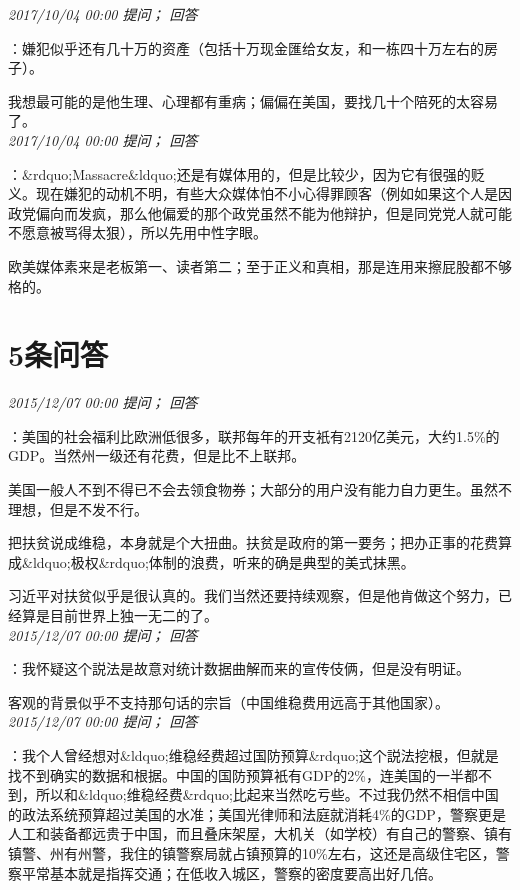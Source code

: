 \documentclass[twocolumn]{ctexart}
\begin{document}
\textit{\hfill\noindent\small 2017/10/04 00:00 提问； 回答}

：嫌犯似乎还有几十万的资產（包括十万现金匯给女友，和一栋四十万左右的房子）。

我想最可能的是他生理、心理都有重病；偏偏在美国，要找几十个陪死的太容易了。\\

\textit{\hfill\noindent\small 2017/10/04 00:00 提问； 回答}

：\&rdquo;Massacre\&ldquo;还是有媒体用的，但是比较少，因为它有很强的贬义。现在嫌犯的动机不明，有些大众媒体怕不小心得罪顾客（例如如果这个人是因政党偏向而发疯，那么他偏爱的那个政党虽然不能为他辩护，但是同党党人就可能不愿意被骂得太狠），所以先用中性字眼。

欧美媒体素来是老板第一、读者第二；至于正义和真相，那是连用来擦屁股都不够格的。\\

\section{5条问答}

\textit{\hfill\noindent\small 2015/12/07 00:00 提问； 回答}

：美国的社会福利比欧洲低很多，联邦每年的开支衹有2120亿美元，大约1.5\%的GDP。当然州一级还有花费，但是比不上联邦。

美国一般人不到不得已不会去领食物券；大部分的用户没有能力自力更生。虽然不理想，但是不发不行。

把扶贫说成维稳，本身就是个大扭曲。扶贫是政府的第一要务；把办正事的花费算成\&ldquo;极权\&rdquo;体制的浪费，听来的确是典型的美式抹黑。

习近平对扶贫似乎是很认真的。我们当然还要持续观察，但是他肯做这个努力，已经算是目前世界上独一无二的了。\\

\textit{\hfill\noindent\small 2015/12/07 00:00 提问； 回答}

：我怀疑这个説法是故意对统计数据曲解而来的宣传伎俩，但是没有明证。

客观的背景似乎不支持那句话的宗旨（中国维稳费用远高于其他国家）。\\

\textit{\hfill\noindent\small 2015/12/07 00:00 提问； 回答}

：我个人曾经想对\&ldquo;维稳经费超过国防预算\&rdquo;这个説法挖根，但就是找不到确实的数据和根据。中国的国防预算衹有GDP的2\%，连美国的一半都不到，所以和\&ldquo;维稳经费\&rdquo;比起来当然吃亏些。不过我仍然不相信中国的政法系统预算超过美国的水准；美国光律师和法庭就消耗4\%的GDP，警察更是人工和装备都远贵于中国，而且叠床架屋，大机关（如学校）有自己的警察、镇有镇警、州有州警，我住的镇警察局就占镇预算的10\%左右，这还是高级住宅区，警察平常基本就是指挥交通；在低收入城区，警察的密度要高出好几倍。
\end{document}
